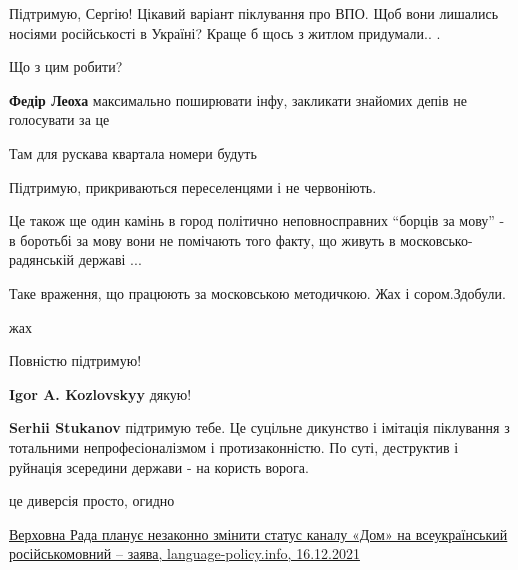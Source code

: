  
 
 
 
 
\zzSecCmt

\begin{itemize} %
Підтримую, Сергію! Цікавий варіант піклування про ВПО. Щоб вони лишались носіями російськості в Україні? Краще б щось з житлом придумали.. .

Що з цим робити?

\textbf{Федір Леоха} максимально поширювати інфу, закликати знайомих депів не голосувати за це

Там для рускава квартала номери будуть

Підтримую, прикриваються переселенцями і не червоніють.

Це також ще один камінь в город політично неповносправних \enquote{борців за мову} - в
боротьбі за мову вони не помічають того факту, що живуть в
московсько-радянській державі ...

Таке враження, що працюють за московською методичкою. Жах і сором.Здобули.

жах


Повністю підтримую!

\textbf{Igor A. Kozlovskyy} дякую!

\textbf{Serhii Stukanov} підтримую тебе.
Це суцільне дикунство і імітація піклування з тотальними непрофесіоналізмом і протизаконністю. По суті, деструктив і руйнація зсередини держави - на користь ворога.

це диверсія просто, огидно


\href{http://language-policy.info/2021/12/verhovna-rada-planuje-nezakonno-zminyty-status-kanalu-dom-na-vseukrajinskyj-rosijskomovnyj-zayava}{%
Верховна Рада планує незаконно змінити статус каналу «Дом» на всеукраїнський російськомовний – заява, %
language-policy.info, 16.12.2021%
}

\end{itemize} %

